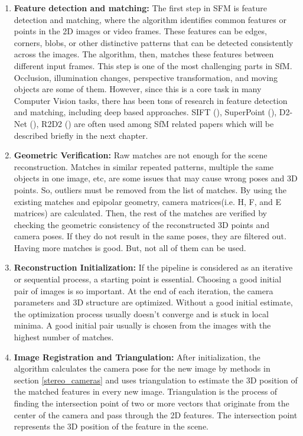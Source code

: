 \documentclass[11pt]{article}
\begin{document}
    \begin{enumerate}
        \item \textbf{Feature detection and matching:} The first step in SFM is feature detection and matching, where
        the algorithm identifies common features or points in the 2D images or video frames. These features
        can be edges, corners, blobs, or other distinctive patterns that can be detected consistently across
        the images. The algorithm, then, matches these features between different input frames. This step is one
        of the most challenging parts in SfM. Occlusion, illumination changes, perspective transformation, and moving objects
        are some of them. However, since this is a core task in many Computer Vision tasks, there has been
        tons of research in feature detection and matching, including deep based approaches. SIFT (\cite{lowe1999object}), SuperPoint (\cite{detone2018superpoint}),
        D2-Net (\cite{dusmanu2019d2net}), R2D2 (\cite{revaud2019r2d2}) are often used among SfM related papers which
        will be described briefly in the next chapter.

        \item \textbf{Geometric Verification:} Raw matches are not enough for the scene reconstruction.
        Matches in similar repeated patterns, multiple the same objects in one image, etc, are some issues that may cause wrong
        poses and 3D points. So, outliers must be removed from the list of matches. By using the existing matches and
        epipolar geometry, camera matrices(i.e. H, F, and E matrices) are calculated.
        Then, the rest of the matches are verified by checking the geometric consistency of the reconstructed 3D points and
        camera poses. If they do not result in the same poses, they are filtered out. Having more matches is good.
        But, not all of them can be used.

        \item \textbf{Reconstruction Initialization:} If the pipeline is considered as an iterative or sequential process,
        a starting point is essential. Choosing a good initial pair of images is so important. At the end of
        each iteration, the camera parameters and 3D structure are optimized. Without a good initial estimate,
        the optimization process usually doesn't converge and is stuck in local minima. A good initial pair usually is
        chosen from the images with the highest number of matches.

        \item \textbf{Image Registration and Triangulation:} After initialization, the algorithm calculates the
        camera pose for the new image by methods in section \ref{stereo_cameras} and uses triangulation to estimate
        the 3D position of the matched features in every new image. Triangulation is the process of finding the intersection point
        of two or more vectors that originate from the center of the camera and pass through the 2D features. The intersection
        point represents the 3D position of the feature in the scene.


\end{enumerate}
\end{document}
